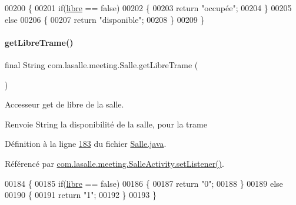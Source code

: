 \begin{DoxyCode}
00200     \{
00201         \textcolor{keywordflow}{if}(\hyperlink{classcom_1_1lasalle_1_1meeting_1_1_salle_a2965cb92b06dcdd28a07fa550259b1c1}{libre} == \textcolor{keyword}{false})
00202         \{
00203             \textcolor{keywordflow}{return} \textcolor{stringliteral}{"occupée"};
00204         \}
00205         \textcolor{keywordflow}{else}
00206         \{
00207             \textcolor{keywordflow}{return} \textcolor{stringliteral}{"disponible"};
00208         \}
00209     \}
\end{DoxyCode}
\mbox{\label{classcom_1_1lasalle_1_1meeting_1_1_salle_a0039fabf5867aef87f5f61f0081bcbcd}} 
\paragraph{\texorpdfstring{get\+Libre\+Trame()}{getLibreTrame()}}
{\footnotesize\ttfamily final String com.\+lasalle.\+meeting.\+Salle.\+get\+Libre\+Trame (\begin{DoxyParamCaption}{ }\end{DoxyParamCaption})}



Accesseur get de libre de la salle. 

\begin{DoxyReturn}{Renvoie}
String la disponibilité de la salle, pour la trame 
\end{DoxyReturn}


Définition à la ligne \hyperlink{_salle_8java_source_l00183}{183} du fichier \hyperlink{_salle_8java_source}{Salle.\+java}.



Référencé par \hyperlink{_salle_activity_8java_source_l00132}{com.\+lasalle.\+meeting.\+Salle\+Activity.\+set\+Listener()}.


\begin{DoxyCode}
00184     \{
00185         \textcolor{keywordflow}{if}(\hyperlink{classcom_1_1lasalle_1_1meeting_1_1_salle_a2965cb92b06dcdd28a07fa550259b1c1}{libre} == \textcolor{keyword}{false})
00186         \{
00187             \textcolor{keywordflow}{return} \textcolor{stringliteral}{"0"};
00188         \}
00189         \textcolor{keywordflow}{else}
00190         \{
00191             \textcolor{keywordflow}{return} \textcolor{stringliteral}{"1"};
00192         \}
00193     \}
\end{DoxyCode}
\mbox{\label{classcom_1_1lasalle_1_1meeting_1_1_salle_a49d977f69b2783e8ad57eccffc29e97b}} 
